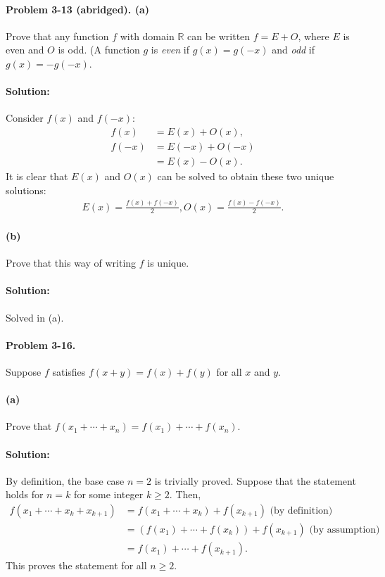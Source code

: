 \documentclass{article}
\begin{document}
\paragraph{Problem 3-13 (abridged). (a)} Prove that any function $f$ with
domain $\mathbb{R}$ can be written $f = E + O$, where $E$ is even and $O$ is
odd. (A function $g$ is \emph{even} if $g(x) = g(-x)$ and \emph{odd} if $g(x) =
-g(-x)$.

\paragraph{Solution:} Consider $f(x)$ and $f(-x)$: \begin{align*}
  f(x)  &= E(x) + O(x), \\
  f(-x) &= E(-x) + O(-x) \\
        &= E(x) - O(x).
\end{align*} It is clear that $E(x)$ and $O(x)$ can be solved to obtain these
two unique solutions: \begin{align*}
  E(x) = \frac{f(x) + f(-x)}{2}, O(x) = \frac{f(x) - f(-x)}{2}.
\end{align*}

\paragraph{(b)} Prove that this way of writing $f$ is unique.

\paragraph{Solution:} Solved in (a).

\paragraph{Problem 3-16.} Suppose $f$ satisfies $f(x + y) = f(x) + f(y)$ for
all $x$ and $y$.

\paragraph{(a)} Prove that $f(x_1 + \cdots + x_n) = f(x_1) + \cdots + f(x_n)$.

\paragraph{Solution:} By definition, the base case $n = 2$ is trivially
proved. Suppose that the statement holds for $n = k$ for some integer $k \geq
2$. Then, \begin{align*}
  f(x_1 + \cdots + x_k + x_{k+1}) &= f(x_1 + \cdots + x_k) + f(x_{k+1})
  \text{ (by definition)} \\
    &= (f(x_1) + \cdots + f(x_k)) + f(x_{k+1}) \text{ (by assumption)} \\
    &= f(x_1) + \cdots + f(x_{k+1}).
\end{align*}
This proves the statement for all $n \geq 2$.
\end{document}
